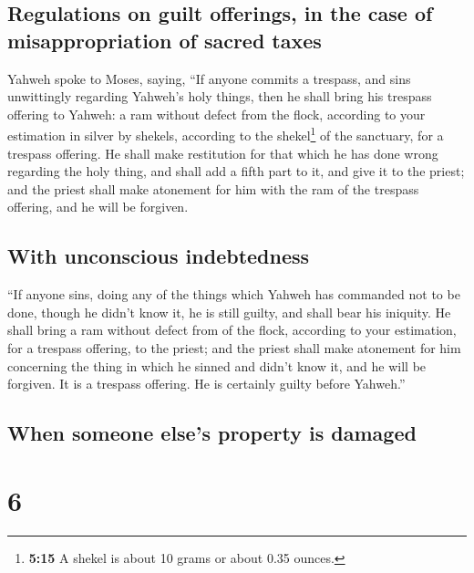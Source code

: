 \hypertarget{regulations-on-guilt-offerings-in-the-case-of-misappropriation-of-sacred-taxes}{%
\subsection{Regulations on guilt offerings, in the case of
misappropriation of sacred
taxes}\label{regulations-on-guilt-offerings-in-the-case-of-misappropriation-of-sacred-taxes}}

 Yahweh spoke to Moses, saying,  ``If
anyone commits a trespass, and sins unwittingly regarding Yahweh's holy
things, then he shall bring his trespass offering to Yahweh: a ram
without defect from the flock, according to your estimation in silver by
shekels, according to the shekel\footnote{\textbf{5:15} A shekel is
  about 10 grams or about 0.35 ounces.} of the sanctuary, for a trespass
offering.  He shall make restitution for that which he
has done wrong regarding the holy thing, and shall add a fifth part to
it, and give it to the priest; and the priest shall make atonement for
him with the ram of the trespass offering, and he will be forgiven.

\hypertarget{with-unconscious-indebtedness}{%
\subsection{With unconscious
indebtedness}\label{with-unconscious-indebtedness}}

 ``If anyone sins, doing any of the things which Yahweh
has commanded not to be done, though he didn't know it, he is still
guilty, and shall bear his iniquity.  He shall bring a
ram without defect from of the flock, according to your estimation, for
a trespass offering, to the priest; and the priest shall make atonement
for him concerning the thing in which he sinned and didn't know it, and
he will be forgiven.  It is a trespass offering. He is
certainly guilty before Yahweh.''

\hypertarget{when-someone-elses-property-is-damaged}{%
\subsection{When someone else's property is
damaged}\label{when-someone-elses-property-is-damaged}}

\hypertarget{section-5}{%
\section{6}\label{section-5}}

